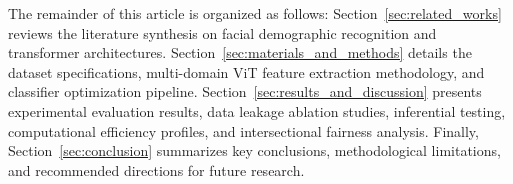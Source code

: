 The remainder of this article is organized as follows: Section~\ref{sec:related_works} reviews the literature synthesis on facial demographic recognition and transformer architectures. Section~\ref{sec:materials_and_methods} details the dataset specifications, multi-domain ViT feature extraction methodology, and classifier optimization pipeline. Section~\ref{sec:results_and_discussion} presents experimental evaluation results, data leakage ablation studies, inferential testing, computational efficiency profiles, and intersectional fairness analysis. Finally, Section~\ref{sec:conclusion} summarizes key conclusions, methodological limitations, and recommended directions for future research.
